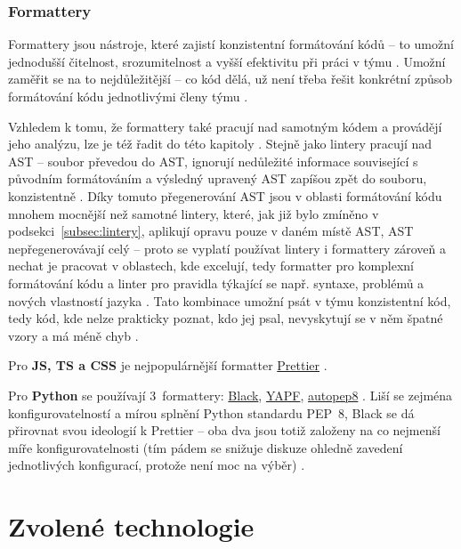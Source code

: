 \subsection{Formattery}

Formattery jsou nástroje, které zajistí konzistentní formátování kódů  -- to umožní jednodušší čitelnost, srozumitelnost a vyšší efektivitu při práci v týmu \cite{linter-medium1}. Umožní zaměřit se na to nejdůležitější -- co kód dělá, už není třeba řešit konkrétní způsob formátování kódu jednotlivými členy týmu \cite{linter-restishistory}. 

Vzhledem k tomu, že formattery také pracují nad samotným kódem a provádějí jeho analýzu, lze je též řadit do této kapitoly \cite{linter-medium1}. Stejně jako lintery pracují nad AST -- soubor převedou do AST, ignorují nedůležité informace související s původním formátováním a výsledný upravený AST zapíšou zpět do souboru, konzistentně \cite{linter-medium1}. Díky tomuto přegenerování AST jsou v oblasti formátování kódu mnohem mocnější než samotné lintery, které, jak již bylo zmíněno v podsekci~\ref{subsec:lintery}, aplikují opravu pouze v daném místě AST, AST nepřegenerovávají celý -- proto se vyplatí používat lintery i formattery zároveň a nechat je pracovat v oblastech, kde excelují, tedy formatter pro komplexní formátování kódu a linter pro pravidla týkající se např. syntaxe, problémů a nových vlastností jazyka \cite{linter-medium2}. Tato kombinace umožní psát v týmu konzistentní kód, tedy kód, kde nelze prakticky poznat, kdo jej psal, nevyskytují se v něm špatné vzory a má méně chyb \cite{linter-restishistory}.

Pro \textbf{JS, TS a CSS} je nejpopulárnější formatter \href{https://prettier.io/}{Prettier} \cite{linter-medium1}. 

Pro \textbf{Python} se používají 3~formattery: \href{https://github.com/psf/black}{Black}, \href{https://github.com/google/yapf}{YAPF}, \href{https://github.com/hhatto/autopep8}{autopep8} \cite{formatter-python, linter-realpython}. Liší se zejména konfigurovatelností a mírou splnění Python standardu PEP~8, Black se dá přirovnat svou ideologií k Prettier -- oba dva jsou totiž založeny na co nejmenší míře konfigurovatelnosti (tím pádem se snižuje diskuze ohledně zavedení jednotlivých konfigurací, protože není moc na výběr) \cite{linter-realpython}.

\chapter{Zvolené technologie}\label{chap:zvolenetechnologie}

